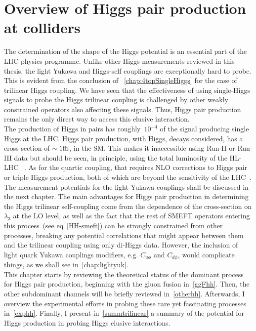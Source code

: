 
\chapter{ Overview of Higgs pair production at colliders }\label{chap:overviewDiHiggs}
The determination of the shape of the Higgs potential is an essential part of the LHC physics programme. Unlike other Higgs measurements reviewed in this thesis, the light Yukawa and Higgs-self couplings are exceptionally hard to probe.  This is evident from the conclusion of ~\autoref{chap:4topSingleHiggs} for the case of trilinear Higgs coupling. We have seen that the effectiveness of using single-Higgs signals to probe the Higgs trilinear coupling is challenged by other weakly constrained operators also affecting these signals. Thus, Higgs pair production remains the only direct way to access this elusive interaction. \\ The production of Higgs in pairs has roughly~$ 10^{-4} $ of the signal producing single Higgs at the LHC. Higgs pair production, with Higgs, decays considered, has a cross-section of $ \sim 1 \si{\femtobarn}$, in the SM. This makes it inaccessible using Run-II or Run-III data but should be seen, in principle, using the total luminosity of the HL-LHC ~\cite{Apollinari:2015bam, ATL-PHYS-PUB-2018-053, Cepeda:2019klc}. As for the quartic coupling, that requires NLO corrections to Higgs pair or triple Higgs production, both of which are beyond the sensitivity of the LHC~\cite{Plehn:2005nk}. The measurement potentials for the light Yukawa couplings shall be discussed in the next chapter.   The main advantages for Higgs pair production in determining the Higgs trilinear self-coupling come from the dependence of the cross-section on $\lambda_3$ at the LO level, as well as the fact that the rest of SMEFT operators entering this process~(see eq~\eqref{HH-smeft}) can be strongly constrained from other processes, breaking any potential correlations that might appear between them and the trilinear coupling using only di-Higgs data. However, the inclusion of light quark Yukawa couplings modifiers, e.g. $ C_{u\phi}$ and $C_{d \phi}$, would complicate things, as we shall see in~\autoref{chap:lightyuk}. \\
This chapter starts by reviewing the theoretical status of the dominant process for Higgs pair production, beginning with the gluon fusion in~\autoref{ggFhh}. Then, the other subdominant channels will be briefly reviewed in~\autoref{otherhh}.  Afterwards, I overview the experimental efforts in probing these rare yet fascinating processes in~\autoref{exphh}. Finally, I present  in~\autoref{summtrilinear} a summary of the potential for Higgs production in probing Higgs elusive interactions.
